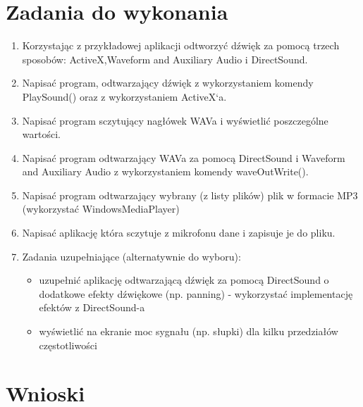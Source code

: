 \documentclass[a4paper,12pt]{extarticle}  %
\begin{document}
\section{Zadania do wykonania}
\begin{enumerate}
	\item Korzystając z przykładowej aplikacji odtworzyć dźwięk za pomocą trzech sposobów: ActiveX,Waveform and Auxiliary Audio i DirectSound.
	\item Napisać program, odtwarzający dźwięk z wykorzystaniem komendy PlaySound() oraz z wykorzystaniem ActiveX`a.
	\item Napisać program sczytujący nagłówek WAVa i wyświetlić poszczególne wartości.
	\item Napisać program odtwarzający WAVa za pomocą DirectSound i Waveform and Auxiliary Audio z wykorzystaniem komendy waveOutWrite().
	\item Napisać program odtwarzający wybrany (z listy plików) plik w formacie MP3 (wykorzystać WindowsMediaPlayer)
	\item Napisać aplikację która sczytuje  z mikrofonu dane i zapisuje je do pliku.
	\item Zadania uzupełniające (alternatywnie do wyboru):
	      \begin{itemize}
		      \item uzupełnić aplikację odtwarzającą dźwięk za pomocą DirectSound o dodatkowe efekty dźwiękowe (np. panning) - wykorzystać implementację efektów z DirectSound-a
		      \item wyświetlić na ekranie moc sygnału (np. słupki) dla kilku przedziałów częstotliwości
	      \end{itemize}
\end{enumerate}
\section{Wnioski}
\end{document}

